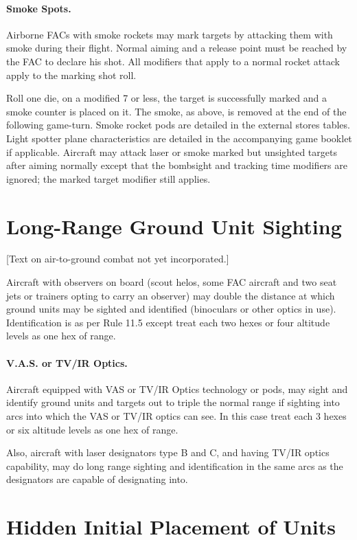 \begin{advancedrules}
\paragraph{Smoke Spots.} Airborne FACs with smoke rockets may mark targets by attacking them with smoke during their flight. Normal aiming and a release point must be reached by the FAC to declare his shot. All modifiers that apply to a normal rocket attack apply to the marking shot roll.

Roll one die, on a modified 7 or less, the target is successfully marked and a smoke counter is placed on it. The smoke, as above, is removed at the end of the following game-turn. Smoke rocket pods are detailed in the external stores tables. Light spotter plane characteristics are detailed in the accompanying game booklet if applicable. Aircraft may attack laser or smoke marked but unsighted targets after aiming normally except that the bombsight and tracking time modifiers are ignored; the marked target modifier still applies.

\fi
\section{Long-Range Ground Unit Sighting}

[Text on air-to-ground combat not yet incorporated.]

\iffalse
Aircraft with observers on board (scout helos, some FAC aircraft and two seat jets or trainers opting to carry an observer) may double the distance at which ground units may be sighted and identified (binoculars or other optics in use).  Identification is as per Rule 11.5 except treat each two hexes or four altitude levels as one hex of range.

\paragraph{V.A.S. or TV/IR Optics.} Aircraft equipped with VAS or TV/IR Optics technology or pods, may sight and identify ground units and targets out to triple the normal range if sighting into arcs into which the VAS or TV/IR optics can see. In this case treat each 3 hexes or six altitude levels as one hex of range.

Also, aircraft with laser designators type B and C, and having TV/IR optics capability, may do long range sighting and identification in the same arcs as the designators are capable of designating into.

\section{Hidden Initial Placement of Units}


\end{advancedrules}
